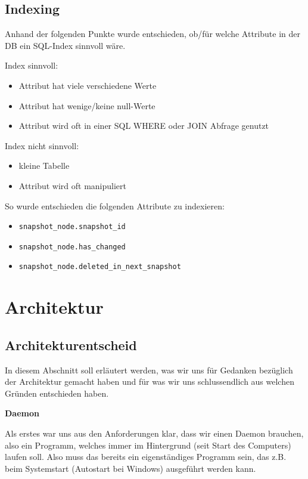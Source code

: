 \documentclass[a4paper,12pt]{report}
\begin{document}
    \subsection{Indexing}
    Anhand der folgenden Punkte wurde entschieden, ob/für welche Attribute in der DB ein SQL-Index sinnvoll wäre.

    Index sinnvoll:
    \begin{itemize}
        \item Attribut hat viele verschiedene Werte
        \item Attribut hat wenige/keine null-Werte
        \item Attribut wird oft in einer SQL WHERE oder JOIN Abfrage genutzt
    \end{itemize}

    Index nicht sinnvoll:
    \begin{itemize}
        \item kleine Tabelle
        \item Attribut wird oft manipuliert
    \end{itemize}

    So wurde entschieden die folgenden Attribute zu indexieren:
    \begin{itemize}
        \item \verb|snapshot_node.snapshot_id|
        \item \verb|snapshot_node.has_changed|
        \item \verb|snapshot_node.deleted_in_next_snapshot|
    \end{itemize}


    \section{Architektur}

    \subsection{Architekturentscheid}
    In diesem Abschnitt soll erläutert werden, was wir uns für Gedanken bezüglich der Architektur gemacht haben
    und für was wir uns schlussendlich aus welchen Gründen entschieden haben.

        {\large\bfseries Daemon}

    Als erstes war uns aus den Anforderungen klar, dass wir einen Daemon brauchen, also ein Programm, welches immer im
    Hintergrund (seit Start des Computers) laufen soll.
    Also muss das bereits ein eigenständiges Programm sein, das z.B. beim Systemstart (Autostart bei Windows) ausgeführt werden kann.
\end{document}
